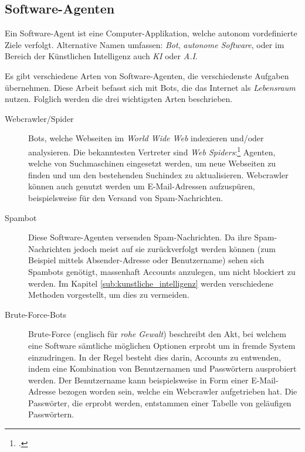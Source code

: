 \subsection{Software-Agenten}
\label{sub:software_agenten}
Ein Software-Agent ist eine Computer-Applikation, welche autonom vordefinierte
Ziele verfolgt. Alternative Namen umfassen: \emph{Bot}, \emph{autonome
Software}, oder im Bereich der Künstlichen Intelligenz auch \emph{KI} oder
\emph{A.I}.

Es gibt verschiedene Arten von Software-Agenten, die verschiedenste Aufgaben
übernehmen. Diese Arbeit befasst sich mit Bots, die das Internet als
\emph{Lebensraum} nutzen. Folglich werden die drei wichtigsten Arten
beschrieben.

\begin{description}
  \item[Webcrawler/Spider]\label{term:spider}
  Bots, welche Webseiten im \emph{World Wide Web} indexieren und/oder
  analysieren. Die bekanntesten Vertreter sind \emph{Web
  Spiders}:\footcite{wa:tkWWWRobot} Agenten, welche von Suchmaschinen eingesetzt
  werden, um neue Webseiten zu finden und um den bestehenden Suchindex zu
  aktualisieren. Webcrawler können auch genutzt werden um E-Mail-Adressen
  aufzuspüren, beispielsweise für den Versand von Spam-Nachrichten.
  
  \item[Spambot]
  Diese Software-Agenten versenden Spam-Nachrichten. Da ihre Spam-Nachrichten
  jedoch meist auf sie zurückverfolgt werden können (zum Beispiel mittels
  Absender-Adresse oder Benutzername) sehen sich Spambots genötigt, massenhaft
  Accounts anzulegen, um nicht blockiert zu werden. Im Kapitel
  \ref{sub:kunstliche_intelligenz} werden verschiedene Methoden vorgestellt, um
  dies zu vermeiden.
  
  \item[Brute-Force-Bots]
  Brute-Force (englisch für \emph{rohe Gewalt}) beschreibt den Akt, bei welchem
  eine Software sämtliche möglichen Optionen erprobt um in fremde System
  einzudringen. In der Regel besteht dies darin, Accounts zu entwenden, indem
  eine Kombination von Benutzernamen und Passwörtern ausprobiert werden. Der
  Benutzername kann beispielsweise in Form einer E-Mail-Adresse bezogen worden
  sein, welche ein Webcrawler aufgetrieben hat. Die Passwörter, die erprobt
  werden, entstammen einer Tabelle von geläufigen Passwörtern.
\end{description}
